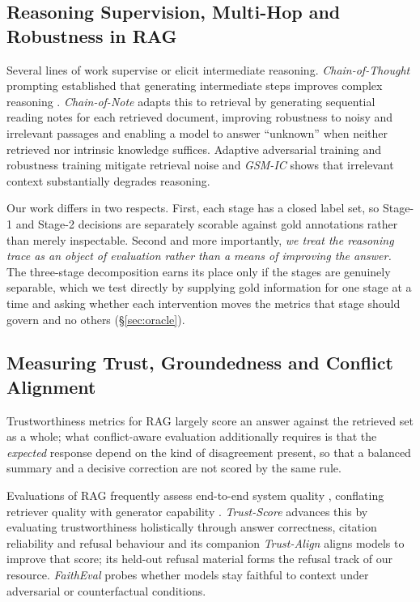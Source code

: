 \documentclass[11pt]{article}
\begin{document}
\subsection{Reasoning Supervision, Multi-Hop and Robustness in RAG}

Several lines of work supervise or elicit intermediate reasoning.
\textit{Chain-of-Thought} prompting established that generating intermediate
steps improves complex reasoning \citep{wei2022cot}. \textit{Chain-of-Note}
\citep{yu2024chainofnote} adapts this to retrieval by generating sequential
reading notes for each retrieved document, improving robustness to noisy and
irrelevant passages and enabling a model to answer ``unknown'' when neither
retrieved nor intrinsic knowledge suffices. Adaptive adversarial training
\citep{fang2024enhancingnoiserobustnessretrievalaugmented} and robustness
training \citep{yoran2024makingretrievalaugmentedlanguagemodels} mitigate
retrieval noise and \textit{GSM-IC} \citep{shi2023largelanguagemodelseasily}
shows that irrelevant context substantially degrades reasoning.

Our work differs in two respects. First, each stage has a closed label set, so
Stage-1 and Stage-2 decisions are separately scorable against gold annotations
rather than merely inspectable. Second and more importantly, \textit{we treat
the reasoning trace as an object of evaluation rather than a means of improving
the answer.} The three-stage decomposition earns its place only if the stages
are genuinely separable, which we test directly by supplying gold information
for one stage at a time and asking whether each intervention moves the metrics
that stage should govern and no others (\S\ref{sec:oracle}).

\subsection{Measuring Trust, Groundedness and Conflict Alignment}

Trustworthiness metrics for RAG largely score an answer against the retrieved
set as a whole; what conflict-aware evaluation additionally requires is that the
\emph{expected} response depend on the kind of disagreement present, so that a
balanced summary and a decisive correction are not scored by the same rule.

Evaluations of RAG frequently assess end-to-end system quality
\citep{gao2024retrievalaugmentedgenerationlargelanguage,xu2024aliiceevaluatingpositionalfinegrained},
conflating retriever quality with generator capability
\citep{fan2024surveyragmeetingllms}. \textit{Trust-Score} \citep{song2025trustalign}
advances this by evaluating trustworthiness holistically through answer
correctness, citation reliability and refusal behaviour and its companion
\textit{Trust-Align} aligns models to improve that score; its held-out refusal
material forms the refusal track of our resource. \textit{FaithEval}
\citep{ming2025faitheval} probes whether models stay faithful to context under
adversarial or counterfactual conditions.
\end{document}
